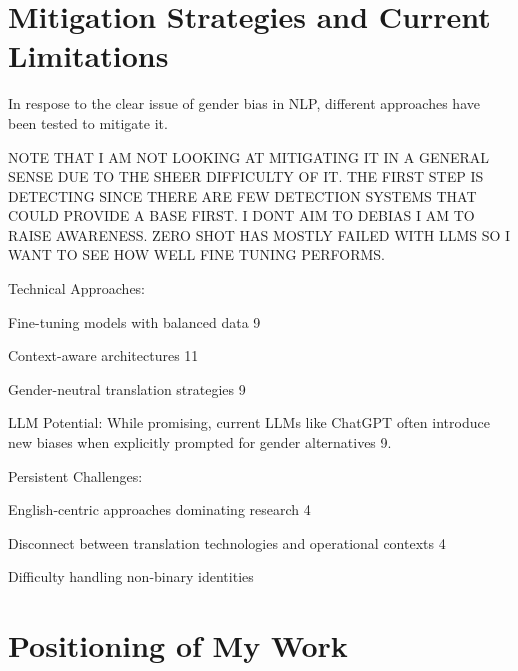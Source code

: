 \section{Mitigation Strategies and Current Limitations}    

In respose to the clear issue of gender bias in NLP, different approaches have been tested to mitigate it.

NOTE THAT I AM NOT LOOKING AT MITIGATING IT IN A GENERAL SENSE DUE TO THE SHEER DIFFICULTY OF IT. THE FIRST STEP IS DETECTING SINCE THERE ARE FEW DETECTION SYSTEMS THAT COULD PROVIDE A BASE FIRST. I DONT AIM TO DEBIAS I AM TO RAISE AWARENESS. ZERO SHOT HAS MOSTLY FAILED WITH LLMS SO I WANT TO SEE HOW WELL FINE TUNING PERFORMS.



Technical Approaches:

Fine-tuning models with balanced data 9

Context-aware architectures 11

Gender-neutral translation strategies 9

LLM Potential: While promising, current LLMs like ChatGPT often introduce new biases when explicitly prompted for gender alternatives 9.

Persistent Challenges:

English-centric approaches dominating research 4

Disconnect between translation technologies and operational contexts 4

Difficulty handling non-binary identities

\section{Positioning of My Work}    
    
